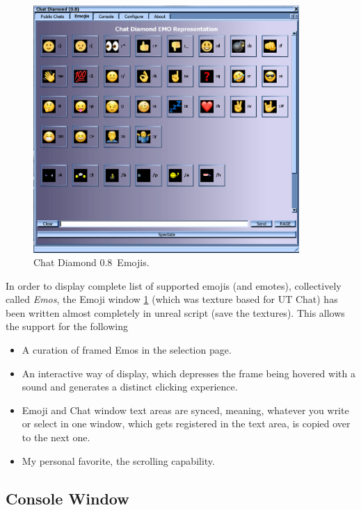 \documentclass{article}
\theoremstyle{definition}
\newcommand{\ChatDiamondVersion}{0.8}
\begin{document}
\begin{figure}
\centering
\includegraphics[width=0.9\textwidth]{img_emos}
\caption{Chat Diamond \ChatDiamondVersion~Emojis.}
\label{fig:chatdiamond_emos}
\end{figure}

In order to display complete list of supported emojis (and emotes), collectively called \emph{Emos}, the Emoji window \ref{fig:chatdiamond_emos} (which was texture based for UT Chat) has been 
written almost completely in unreal script (save the textures).  This allows the support for the following 
\begin{itemize}
\item A curation of framed Emos in the selection page.
\item An interactive way of display, which depresses the frame being hovered with a sound and generates a distinct clicking
experience.
\item Emoji and Chat window text areas are synced, meaning, whatever you write or select in one window, which gets registered
in the text area, is copied over to the next one.
\item My personal favorite, the scrolling capability.
\end{itemize}


\subsection{Console Window}
\end{document}
